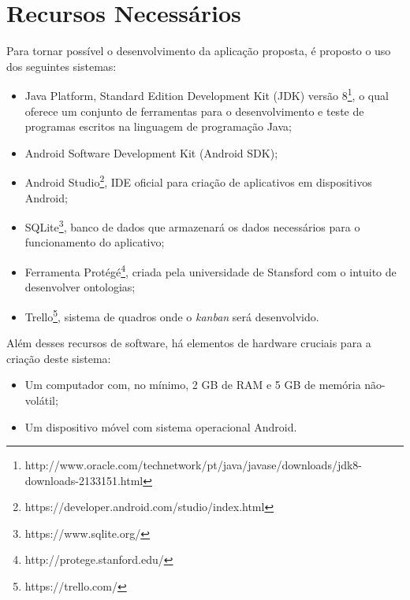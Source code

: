 \chapter{\label{chap:recurs}Recursos Necessários}
Para tornar possível o desenvolvimento da aplicação proposta, é proposto o uso dos seguintes sistemas:
\begin{itemize}
    \item Java Platform, Standard Edition Development Kit (JDK) versão 8\footnote{http://www.oracle.com/technetwork/pt/java/javase/downloads/jdk8-downloads-2133151.html}, o qual oferece um conjunto de ferramentas para o desenvolvimento e teste de programas escritos na linguagem de programação Java;
    \item Android Software Development Kit (Android SDK);
    \item Android Studio\footnote{https://developer.android.com/studio/index.html}, IDE oficial para criação de aplicativos em dispositivos Android;
    \item SQLite\footnote{https://www.sqlite.org/}, banco de dados que armazenará os dados necessários para o funcionamento do aplicativo;
    \item Ferramenta Protégé\footnote{http://protege.stanford.edu/}, criada pela universidade de Stansford com o intuito de desenvolver ontologias;
    \item Trello\footnote{https://trello.com/}, sistema de quadros onde o \emph{kanban} será desenvolvido.
\end{itemize}
Além desses recursos de software, há elementos de hardware cruciais para a criação deste sistema:
    \begin{itemize}
        \item Um computador com, no mínimo, 2 GB de RAM e 5 GB de memória não-volátil;
        \item Um dispositivo móvel com sistema operacional Android.
    \end{itemize}